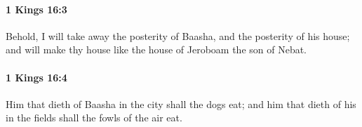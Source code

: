 		\paragraph{1 Kings 16:3} %
			\label{1KINGS-16-3}

			Behold, I will take away the posterity of Baasha, and the posterity of his house; and will make thy house like the house of Jeroboam the son of Nebat.


		\paragraph{1 Kings 16:4} %
			\label{1KINGS-16-4}

			Him that dieth of Baasha in the city shall the dogs eat; and him that dieth of his in the fields shall the fowls of the air eat.


